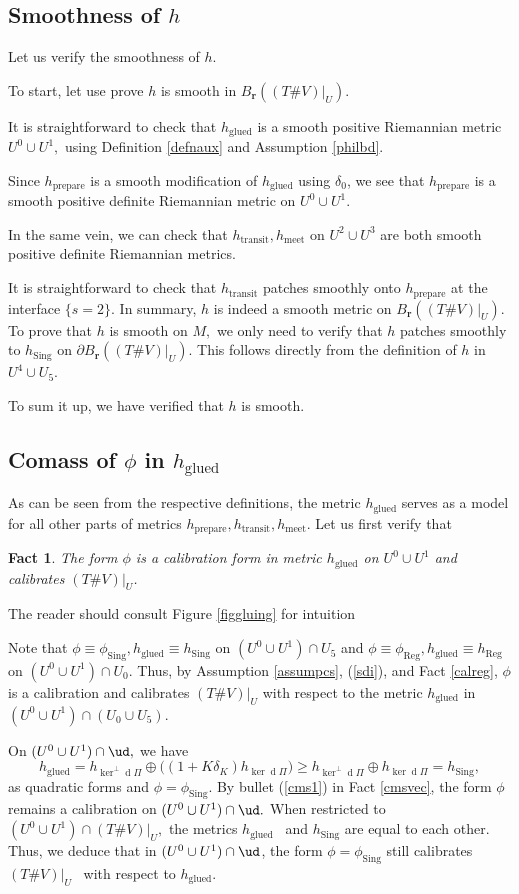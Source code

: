 \documentclass[11pt,a4paper]{amsart}
\numberwithin{equation}{section}
\newcommand{\hgd}{h_{\operatorname{glued}}}
\newcommand{\htt}{h_{\operatorname{transit}}}
\newcommand{\hpp}{h_{\operatorname{prepare}}}
\newcommand{\hmt}{h_{\operatorname{meet}}}
\newcommand{\reg}{{\operatorname{Reg}}}
\newcommand{\sing}{{\operatorname{Sing}}}
\newcommand{\de}{\delta}
\newcommand{\ed}{{\operatorname{d}}}
\newcommand{\hkp}{h_{\ker \ed\Pi}}
\newcommand{\hkn}{h_{\ker^\perp \ed\Pi}}
\newcommand{\pd}{\partial}
\newcommand{\mfr}{{\mathbf{r}}}
\newcommand{\tvu}{(T\#V)|_U}
\newcommand{\ur}{B_{\mfr}(\tvu)}
\theoremstyle{plain}
\newtheorem{fact}[exam]{Fact}
\theoremstyle{definition}
\numberwithin{equation}{subsection}
\begin{document}
	\subsection{Smoothness of $h$}
	Let us verify the smoothness of $h.$
	
	To start, let use prove $h$ is smooth in $\ur.$
	
	It is straightforward to check that $\hgd$ is a smooth positive Riemannian metric $U^0\cup U^1,$ using Definition \ref{defnaux} and Assumption \ref{philbd}. 
	
	Since $\hpp$ is a smooth modification of $\hgd$ using $\de_0$, we see that $\hpp$ is a smooth positive definite Riemannian metric on $U^0\cup U^1$. 
	
	In the same vein, we can check that $\htt,\hmt$ on $U^2\cup U^3$ are both smooth positive definite Riemannian metrics.
	
	It is straightforward to check that $\htt$ patches smoothly onto $\hpp$ at the interface $\{s=2\}$. In summary, $h$ is indeed a smooth metric on $\ur.$ To prove that $h$ is smooth on $M,$ we only need to verify that $h$ patches smoothly to $h_\sing$ on $\pd\ur.$ This follows directly from the definition of $h$ in $ U^4\cup U_5.$
	
	To sum it up, we have verified that $h$ is smooth. \subsection{Comass of $\phi$ in $\hgd$}
	As can be seen from the respective definitions, the metric $\hgd$ serves as a model for all other parts of metrics $\hpp,\htt,\hmt$. Let us first verify that
	\begin{fact}\label{fcthgd}
		The form $\phi$ is a calibration form in metric $\hgd$ on $U^0\cup U^1$ and calibrates $\tvu$.
	\end{fact}
	The reader should consult Figure \ref{figgluing} for intuition
	
	Note that $\phi\equiv\phi_\sing,\hgd\equiv h_\sing$ on $(U^0\cup U^1)\cap U_5$ and $\phi\equiv \phi_\reg,\hgd\equiv h_\reg$ on $(U^0\cup U^1)\cap U_0$. Thus, by Assumption \ref{assumpcs}, (\ref{sdi}), and Fact \ref{calreg}, $\phi$ is a calibration and calibrates $\tvu$ with respect to the metric $\hgd$ in $(U^0\cup U^1)\cap (U_0\cup U_5)$.
	
	On $(U^0\cup U^1)\cap {\ud},$ we have $$\hgd=\hkn\oplus \big((1+K\de_K)\hkp\big)\ge \hkn\oplus \hkp=h_\sing,$$ as quadratic forms and $\phi=\phi_\sing.$ By bullet (\ref{cms1}) in Fact \ref{cmsvec}, the form $\phi$ remains a calibration on $(U^0\cup U^1)\cap {\ud}.$ When restricted to $(U^0\cup U^1)\cap \tvu,$ the metrics $\hgd$  and $h_\sing$ are equal to each other. Thus, we deduce that in $(U^0\cup U^1)\cap {\ud}$, the form $\phi=\phi_\sing$ still calibrates $\tvu$  with respect to $\hgd.$
	
\end{document}
